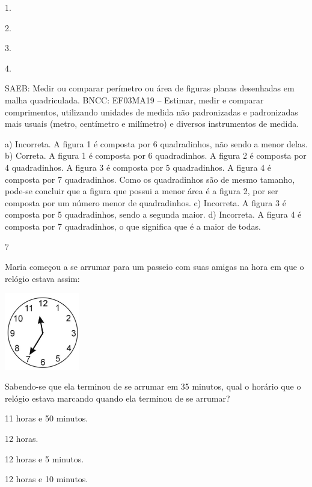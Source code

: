 \begin{multicols}{2}
{\begin{escolha}
{\begin{escolha}
\item
  1.
\item
  2.
\item
  3.
\item
  4.
\end{escolha}

SAEB: Medir ou comparar perímetro ou área de figuras planas desenhadas em malha quadriculada.
BNCC: EF03MA19 -- Estimar, medir e comparar comprimentos, utilizando unidades de medida
não padronizadas e padronizadas mais usuais (metro, centímetro e milímetro) e diversos
instrumentos de medida.

a) Incorreta. A figura 1 é composta por 6 quadradinhos, não sendo a menor delas.
b) Correta. A figura 1 é composta por 6 quadradinhos. A figura 2 é composta por 4 quadradinhos. A figura 3 é composta por 5 quadradinhos. A figura 4 é composta por 7 quadradinhos. Como os quadradinhos são de mesmo tamanho, pode-se concluir que a figura que possui a menor área é a figura 2, por ser composta por um número menor de quadradinhos.
c) Incorreta. A figura 3 é composta por 5 quadradinhos, sendo a segunda maior.
d) Incorreta. A figura 4 é composta por 7 quadradinhos, o que significa que é a maior de todas.

\num{7}

Maria começou a se arrumar para um passeio com suas amigas na hora em que o relógio estava assim:


\includegraphics[width=1.29487in,height=1.32633in]{media/image134.png}

Sabendo-se que ela terminou de se arrumar em 35 minutos, qual o horário que o relógio estava marcando quando ela terminou de se arrumar?

\begin{escolha}

\item
  11 horas e 50 minutos.
\item
  12 horas.
\item
  12 horas e 5 minutos.
\item
  12 horas e 10 minutos.
\end{escolha}

}
\end{escolha}}
\end{multicols}
